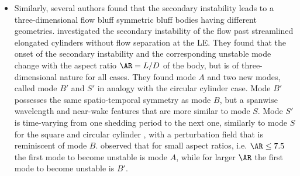 \documentclass[onecolumn,notitlepage,superscriptaddress, amsmath,amssymb,longbibliographyaps,floatfix]{revtex4-1}
\begin{document}
\begin{itemize}
  \item Similarly, several authors found that the secondary instability leads to a three-dimensional flow bluff symmetric bluff bodies having different geometries. \cite{ryan-etal-2005} investigated the secondary instability of the flow past streamlined elongated cylinders without flow separation at the LE. They found that the onset of the secondary instability and the corresponding unstable mode change with the aspect ratio $\AR=L/D$ of the body, but is of three-dimensional nature for all cases. They found mode $A$ and two new modes, called mode $B'$ and $S'$ in analogy with the circular cylinder case. Mode $B'$ possesses the same spatio-temporal symmetry as mode $B$, but a spanwise wavelength and near-wake features that are more similar to mode $S$. Mode $S'$ is time-varying from one shedding period to the next one, similarly to mode $S$ for the square and circular cylinder \cite{robicheaux-etal-1999}, with a perturbation field that is reminiscent of mode $B$. \cite{ryan-etal-2005} observed that for small aspect ratios, i.e. $\AR \le 7.5$ the first mode to become unstable is mode $A$, while for larger $\AR$ the first mode to become unstable is $B'$. 

\end{itemize}
\end{document}
